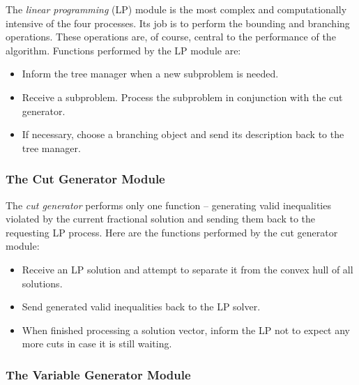 The {\em linear programming} (LP) module is the most complex and
computationally intensive of the four processes. Its job is to perform
the bounding and branching operations. These operations
are, of course, central to the performance of the algorithm. Functions
performed by the LP module are:
\begin{itemize}
\item Inform the tree manager when a new subproblem is needed.
\item Receive a subproblem. Process the subproblem in conjunction
  with the cut generator. %
\item If necessary, choose a branching object and send its
  description back to the tree manager.
\end{itemize} 

\subsubsection{The Cut Generator Module}

The {\em cut generator} performs only one function -- generating valid
inequalities violated by the current fractional solution and sending
them back to the requesting LP process. Here are the functions
performed by the cut generator module:
\begin{itemize}
\item Receive an LP solution and attempt to separate it from the convex hull
  of all solutions. 
\item Send generated valid inequalities back to the LP solver.  
\item When finished processing a solution vector, inform the
  LP not to expect any more cuts in case it is still waiting.
\end{itemize}

\subsubsection{The Variable Generator Module}

